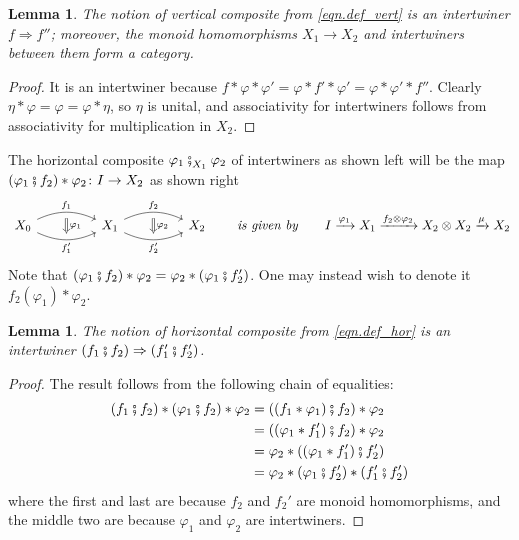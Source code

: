 \documentclass[11pt, one side, article]{memoir}
\theoremstyle{definition}
\theoremstyle{plain}
\newtheorem{lemma}[definitionx]{Lemma}
\newcommand{\then}{\mathbin{\fatsemi}}
\newcommand{\To}[2][]{\xrightarrow[#1]{#2}}
\newcommand{\imp}{\Rightarrow}
\newcommand{\tn}[1]{\textnormal{#1}}
\newcommand{\0}{\textsf{0}}
\newcommand{\1}{\tn{\textsf{1}}}
\newcommand{\hh}[2][]{#1 \tn{\textit{#2}} #1}
\newcommand{\qqby}{\hh[\qquad]{is given by}}
\begin{document}
\begin{lemma}\label{lemma.ver_comp}
The notion of vertical composite from \eqref{eqn.def_vert} is an intertwiner $f\imp f''$; moreover, the monoid homomorphisms $X_1\to X_2$ and intertwiners between them form a category.
\end{lemma}
\begin{proof}
It is an intertwiner because $f*\varphi*\varphi'=\varphi*f'*\varphi'=\varphi*\varphi'*f''$. Clearly $\eta*\varphi=\varphi=\varphi*\eta$, so $\eta$ is unital, and associativity for intertwiners follows from associativity for multiplication in $X_2$.
\end{proof}

The horizontal composite $\varphi_1\then_{X_1}\varphi_2$ of intertwiners as shown left will be the map $(\varphi_1\then f_2)*\varphi_2\colon I\to X_2$ as shown right
\begin{equation}\label{eqn.def_hor}
\begin{tikzcd}[column sep=45pt]
	X_0\ar[r, bend left=25pt, "f_1", ""' name=a1]\ar[r, bend right=25pt, "f_1'"', "" name=b1]&
	X_1\ar[r, bend left=25pt, "f_2", ""' name=a2]\ar[r, bend right=25pt, "f_2'"', "" name=b2]&
	X_2
	\ar[from=a1, to=b1, Rightarrow, "\varphi_1"]
	\ar[from=a2, to=b2, Rightarrow, "\varphi_2"]
\end{tikzcd}
\qqby
I\To{\varphi_1}X_1\To{f_2\otimes\varphi_2}X_2\otimes X_2\To{\mu}X_2
\end{equation}
Note that $(\varphi_1\then f_2)*\varphi_2=\varphi_2*(\varphi_1\then f_2')$. One may instead wish to denote it $f_2(\varphi_1)*\varphi_2$. 

\begin{lemma}\label{lemma.hor_comp}
The notion of horizontal composite from \eqref{eqn.def_hor} is an intertwiner $(f_1\then f_2)\imp (f_1'\then f_2')$.
\end{lemma}
\begin{proof}
The result follows from the following chain of equalities:
\begin{align*}
	(f_1\then f_2)*(\varphi_1\then f_2)*\varphi_2&=
	((f_1*\varphi_1)\then f_2)*\varphi_2\\&=
	((\varphi_1*f_1')\then f_2)*\varphi_2\\&=
	\varphi_2*((\varphi_1*f_1')\then f_2')\\&=
	\varphi_2*(\varphi_1\then f_2')*(f_1'\then f_2')
\end{align*}
where the first and last are because $f_2$ and $f_2'$ are monoid homomorphisms, and the middle two are because $\varphi_1$ and $\varphi_2$ are intertwiners.
\end{proof}
\end{document}
